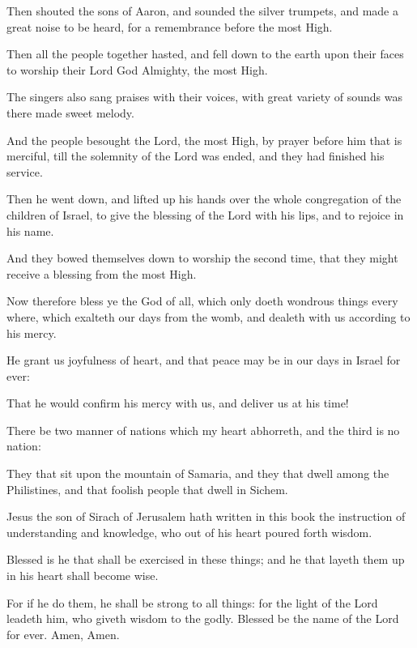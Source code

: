 {\par }{\PP {}Then shouted the sons of Aaron, and sounded the silver trumpets, and made a great noise to be heard, for a remembrance before the most High.
\par }{\PP {}Then all the people together hasted, and fell down to the earth upon their faces to worship their Lord God Almighty, the most High.
\par }{\PP {}The singers also sang praises with their voices, with great variety of sounds was there made sweet melody.
\par }{\PP {}And the people besought the Lord, the most High, by prayer before him that is merciful, till the solemnity of the Lord was ended, and they had finished his service.
\par }{\PP {}Then he went down, and lifted up his hands over the whole congregation of the children of Israel, to give the blessing of the Lord with his lips, and to rejoice in his name.
\par }{\PP {}And they bowed themselves down to worship the second time, that they might receive a blessing from the most High.
\par }{\PP {}Now therefore bless ye the God of all, which only doeth wondrous things every where, which exalteth our days from the womb, and dealeth with us according to his mercy.
\par }{\PP {}He grant us joyfulness of heart, and that peace may be in our days in Israel for ever:
\par }{\PP {}That he would confirm his mercy with us, and deliver us at his time!
\par }{\PP {}There be two manner of nations which my heart abhorreth, and the third is no nation:
\par }{\PP {}They that sit upon the mountain of Samaria, and they that dwell among the Philistines, and that foolish people that dwell in Sichem.
\par }{\PP {}Jesus the son of Sirach of Jerusalem hath written in this book the instruction of understanding and knowledge, who out of his heart poured forth wisdom.
\par }{\PP {}Blessed is he that shall be exercised in these things; and he that layeth them up in his heart shall become wise.
\par }{\PP {}For if he do them, he shall be strong to all things: for the light of the Lord leadeth him, who giveth wisdom to the godly. Blessed be the name of the Lord for ever. Amen, Amen.

}
